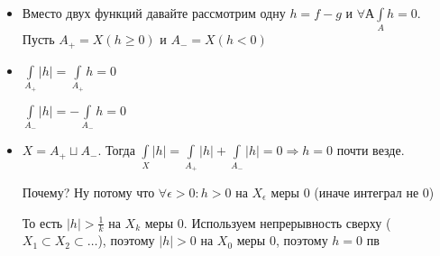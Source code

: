 \documentclass[paper=a4, fontsize=17pt]{article}
\begin{document}
		\begin{itemize}
			\item
			Вместо двух функций давайте рассмотрим одну $h = f - g$ и $\forall А \int\limits_A h = 0$. Пусть $A_{+} = X(h\geq 0)$ и $A_- = X(h < 0)$
			\item
			$\int\limits_{A_+} |h| = \int\limits_{A_+} h = 0$ \par
			$\int\limits_{A_-} |h| = -\int\limits_{A_-} h = 0$
			\item
			$X = A_+ \sqcup A_-$. Тогда $\int\limits_X |h| = \int\limits_{A_+} |h| + \int\limits_{A_-} |h| = 0 \Rightarrow h = 0$ почти везде.
			
			Почему? Ну потому что $\forall \epsilon > 0 : h > 0$ на $X_{\epsilon}$ меры $0$ (иначе интеграл не $0$)
			
			То есть $|h| > \frac{1}{k}$ на $X_k$ меры $0$. Используем непрерывность сверху ($X_1 \subset X_2 \subset \ldots $), поэтому $|h| > 0$ на $X_0$ меры $0$, поэтому $h = 0$ пв
		\end{itemize}
\end{document}
